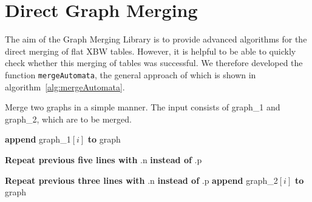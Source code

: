 \documentclass[a4paper,12pt,twoside,BCOR=10mm]{scrbook}
\begin{document}
\section{Direct Graph Merging}
\label{sec:direct_graph_merging}

The aim of the Graph Merging Library is to provide advanced algorithms 
for the direct merging of flat XBW tables. 
However, it is helpful to be able to quickly check whether this merging of tables 
was successful. 
We therefore developed the function \texttt{mergeAutomata}, 
the general approach of which is shown in algorithm~\ref{alg:mergeAutomata}. 
\begin{algorithm}
\caption[Merge two graphs]{Merge two graphs in a simple manner. The input consists of graph\_1 and graph\_2, which are to be merged.}
\label{alg:mergeAutomata}
\begin{algorithmic}[1]


\State \phantom{nl}

	\Else
		\State \textbf{append} graph\_1$[ i ]$ \textbf{to} graph
	\EndIf
\EndFor

\State \phantom{nl}

\EndFor

\State \phantom{nl}

		\EndIf
	\EndFor
	\State \textbf{Repeat previous five lines with} .n \textbf{instead of} .p
\EndFor

\State \phantom{nl}

	\EndFor
	\State \textbf{Repeat previous three lines with} .n \textbf{instead of} .p
	\State \textbf{append} graph\_2$[ i ]$ \textbf{to} graph
\EndFor


\end{algorithmic}
\end{algorithm}
\end{document}
